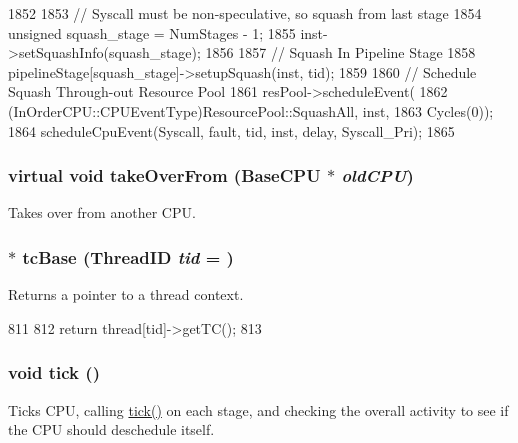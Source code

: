 \begin{DoxyCode}
1852 {
1853     // Syscall must be non-speculative, so squash from last stage
1854     unsigned squash_stage = NumStages - 1;
1855     inst->setSquashInfo(squash_stage);
1856 
1857     // Squash In Pipeline Stage
1858     pipelineStage[squash_stage]->setupSquash(inst, tid);
1859 
1860     // Schedule Squash Through-out Resource Pool
1861     resPool->scheduleEvent(
1862         (InOrderCPU::CPUEventType)ResourcePool::SquashAll, inst,
1863         Cycles(0));
1864     scheduleCpuEvent(Syscall, fault, tid, inst, delay, Syscall_Pri);
1865 }
\end{DoxyCode}
\hypertarget{classInOrderCPU_a9d27673c51f2406024ca1ce8ff2de4fb}{
\subsubsection[{takeOverFrom}]{\setlength{\rightskip}{0pt plus 5cm}virtual void takeOverFrom ({\bf BaseCPU} $\ast$ {\em oldCPU})}}
\label{classInOrderCPU_a9d27673c51f2406024ca1ce8ff2de4fb}
Takes over from another CPU. \hypertarget{classInOrderCPU_a1f4a6bd6bfbb29196452b0dfa68b1c9e}{
\subsubsection[{tcBase}]{$\ast$ tcBase ({\bf ThreadID} {\em tid} = {})}}
\label{classInOrderCPU_a1f4a6bd6bfbb29196452b0dfa68b1c9e}
Returns a pointer to a thread context. 


\begin{DoxyCode}
811     {
812         return thread[tid]->getTC();
813     }
\end{DoxyCode}
\hypertarget{classInOrderCPU_a873dd91783f9efb4a590aded1f70d6b0}{
\subsubsection[{tick}]{\setlength{\rightskip}{0pt plus 5cm}void tick ()}}
\label{classInOrderCPU_a873dd91783f9efb4a590aded1f70d6b0}
Ticks CPU, calling \hyperlink{classInOrderCPU_a873dd91783f9efb4a590aded1f70d6b0}{tick()} on each stage, and checking the overall activity to see if the CPU should deschedule itself. 


